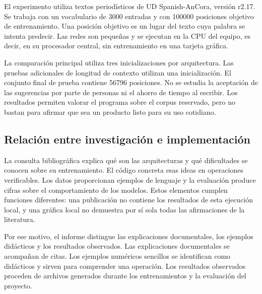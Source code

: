 El experimento utiliza textos periodísticos de UD Spanish-AnCora, versión r2.17. Se trabaja con un vocabulario de 3000 entradas y con 100000 posiciones objetivo de entrenamiento. Una posición objetivo es un lugar del texto cuya palabra se intenta predecir. Las redes son pequeñas y se ejecutan en la CPU del equipo, es decir, en su procesador central, sin entrenamiento en una tarjeta gráfica.

La comparación principal utiliza tres inicializaciones por arquitectura. Las pruebas adicionales de longitud de contexto utilizan una inicialización. El conjunto final de prueba contiene 56796 posiciones. No se estudia la aceptación de las sugerencias por parte de personas ni el ahorro de tiempo al escribir. Los resultados permiten valorar el programa sobre el corpus reservado, pero no bastan para afirmar que sea un producto listo para su uso cotidiano.

\subsection{Relación entre investigación e implementación}
La consulta bibliográfica explica qué son las arquitecturas y qué dificultades se conocen sobre su entrenamiento. El código concreta esas ideas en operaciones verificables. Los datos proporcionan ejemplos de lenguaje y la evaluación produce cifras sobre el comportamiento de los modelos. Estos elementos cumplen funciones diferentes: una publicación no contiene los resultados de esta ejecución local, y una gráfica local no demuestra por sí sola todas las afirmaciones de la literatura.

Por ese motivo, el informe distingue las explicaciones documentales, los ejemplos didácticos y los resultados observados. Las explicaciones documentales se acompañan de citas. Los ejemplos numéricos sencillos se identifican como didácticos y sirven para comprender una operación. Los resultados observados proceden de archivos generados durante los entrenamientos y la evaluación del proyecto.

